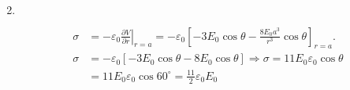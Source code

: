 \begin{enumerate}
\begin{answer}
\begin{align*}
		\end{align*}
	\end{answer}
	\item $\left. \right. $
	\begin{answer}
		\begin{align*}
	\sigma&=-\left.\varepsilon_{0} \frac{\partial V}{\partial r}\right|_{r=a}=-\varepsilon_{0}\left[-3 E_{0} \cos \theta-\frac{8 E_{0} a^{3}}{r^{3}} \cos \theta\right]_{r=a}.\\
		\sigma&=-\varepsilon_{0}\left[-3 E_{0} \cos \theta-8 E_{0} \cos \theta\right] \Rightarrow \sigma=11 E_{0} \varepsilon_{0} \cos \theta\\&=11 E_{0} \varepsilon_{0} \cos 60^{\circ}=\frac{11}{2} \varepsilon_{0} E_{0}
		\end{align*}
	\end{answer}
	
\end{enumerate}